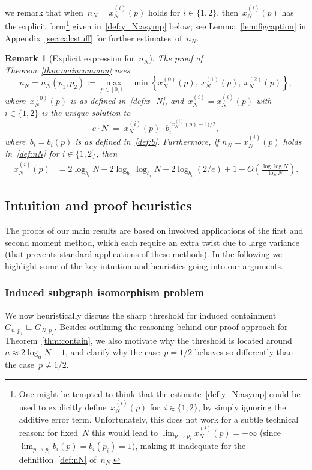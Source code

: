 \documentclass{article}
\newcommand\lrpar[1]{\left(#1\right)}
\newcommand{\xone}{x^{(1)}}
\newcommand{\xtwo}{x^{(2)}}
\newcommand{\xot}{x^{(0)}}
\newcommand{\isub}{\sqsubseteq}
\newtheorem{remark}{Remark}
\newcommand\bigpar[1]{\bigl(#1\bigr)}
\newcommand{\refT}[1]{Theorem~\ref{#1}}
\begin{document}
we remark that when~$n_N=x^{(i)}_N(p)$ holds for $i\in \{1,2\}$, 
then~$x^{(i)}_N(p)$ has the explicit form\footnote{One might be tempted to think that the estimate~\eqref{def:y_N:asymp} could be used 
to explicitly define~$x^{(i)}_N(p)$ for~$i \in \{1,2\}$, by simply ignoring the additive error term. 
Unfortunately, this does not work for a subtle technical reason: 
for fixed~$N$ this would lead to ${\lim_{p \to p_i}x^{(i)}_{N}(p)=-\infty}$ (since~${\lim_{p \to p_i}b_i(p)=b_i(p_i)=1}$), 
making it inadequate for the definition~\eqref{def:nN} of~$n_N$.} 
given in~\eqref{def:y_N:asymp} below; 
see Lemma~\ref{lem:figcaption} in Appendix~\ref{sec:calcstuff} for further estimates~of~$n_N$.
\begin{remark}[Explicit expression for~$n_N$]\label{rem:savingold}The proof of Theorem~\ref{thm:maincommon} uses \begin{equation}\label{def:nN}
n_N=n_N(p_1,p_2) :=\max_{p\in [0,1]} \; \min\left\{\xot_N(p), \: \xone_N(p), \: \xtwo_N(p) \right\} ,
\end{equation}
where~$\xot_N(p)$ is as defined in~\eqref{def:x_N}, 
and~$x^{(i)}_N=x^{(i)}_N(p)$ with~$i\in\{1,2\}$ is the unique solution to 
\begin{equation}\label{def:xi}
    e\cdot N \; = \; x^{(i)}_N(p) \cdot b_i^{\bigpar{x^{(i)}_N(p)-1}/2},
\end{equation}
where~$b_i=b_i(p)$ is as defined in~\eqref{def:b}. 
Furthermore, if  $n_N=x^{(i)}_N(p)$ holds in~\eqref{def:nN} for $i\in \{1,2\}$, then 
\begin{align}
\label{def:y_N:asymp}
x^{(i)}_N(p) & = 2\log_{b_i}N-2\log_{b_i}\log_{b_i}N-2\log_{b_i}(2/e) +1 +O\lrpar{ \frac{\log\log N}{\log N}}.
\end{align}
\end{remark}





\subsection{Intuition and proof heuristics}\label{sec:heur} 
The proofs of our main results are based on involved applications of the first and second moment method, 
which each require an extra twist due to large variance (that prevents standard applications of these methods). 
In the following we highlight some of the key intuition and heuristics going into our arguments. 

 
\subsubsection{Induced subgraph isomorphism problem}\label{sec:heur:ISIP}
We now heuristically discuss the sharp threshold for induced containment~${G_{n,p_1} \isub G_{N,p_2}}$. 
Besides outlining the reasoning behind our proof approach for \refT{thm:contain}, we also motivate why the threshold is located around~${n \approx 2\log_a N + 1}$, 
and clarify why the case~${p=1/2}$ behaves so differently than the case~${p \neq 1/2}$. 
\end{document}
